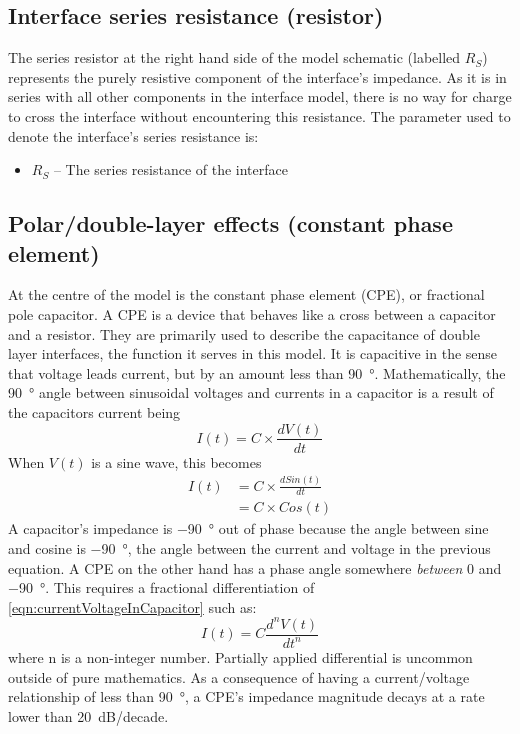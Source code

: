   \subsection{Interface series resistance (resistor)}


    The series resistor at the right hand side of the model schematic (labelled $R_{S}$) represents the purely resistive component of the interface's impedance.
    As it is in series with all other components in the interface model, there is no way for charge to cross the interface without encountering this resistance.
    The parameter used to denote the interface's series resistance is:
    \begin{itemize}
      \item $R_S$ -- The series resistance of the interface
    \end{itemize}

  \subsection{Polar/double-layer effects (constant phase element)}

    At the centre of the model is the constant phase element (CPE), or fractional pole capacitor.
    A CPE is a device that behaves like a cross between a capacitor and a resistor.
    They are primarily used to describe the capacitance of double layer interfaces, the function it serves in this model.
    It is capacitive in the sense that voltage leads current, but by an amount less than \SI{90}{\degree}.
    Mathematically, the \SI{90}{\degree} angle between sinusoidal voltages and currents in a capacitor is a result of the capacitors current being
    \begin{equation}
    I(t) = C \times \frac{dV(t)}{dt}
    \label{eqn:currentVoltageInCapacitor}
    \end{equation}
    When $V(t)$ is a sine wave, this becomes
    \begin{align}
      I(t) &= C \times \frac{d Sin(t)}{dt}\\
           &= C \times Cos(t)
    \end{align}
    A capacitor's impedance is \SI{-90}{\degree} out of phase because the angle between sine and cosine is \SI{-90}{\degree}, the angle between the current and voltage in the previous equation.
    A CPE on the other hand has a phase angle somewhere \emph{between} 0 and \SI{-90}{\degree}.
    This requires a fractional differentiation of \cref{eqn:currentVoltageInCapacitor} such as:
    \begin{equation}
      I(t) = C \frac{d^n V(t)}{dt^n}
    \end{equation}
    where n is a non-integer number.
    Partially applied differential is uncommon outside of pure mathematics.
    As a consequence of having a current/voltage relationship of less than \SI{90}{\degree}, a CPE's impedance magnitude decays at a rate lower than 20\ dB/decade.

